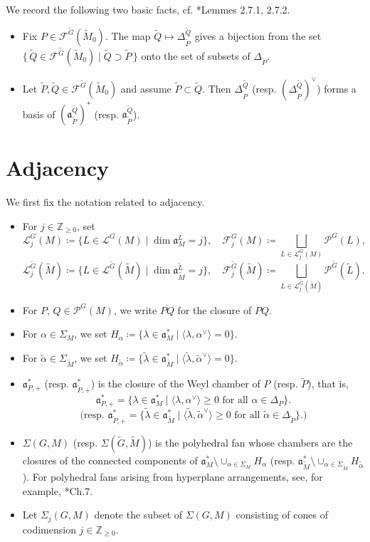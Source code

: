 \documentclass[12pt]{amsart}
\theoremstyle{definition}
\theoremstyle{plain}
\theoremstyle{remark}
\def\Z{\mathbb{Z}}%
\newcommand{\fa}{\mathfrak{a}}
\newcommand{\cF}{\mathcal{F}}
\newcommand{\cL}{\mathcal{L}}
\newcommand{\cP}{\mathcal{P}}
\numberwithin{equation}{section}
\newcommand{\tG}{\widetilde{G}}
\newcommand{\tM}{\widetilde{M}}
\newcommand{\tL}{\widetilde{L}}
\newcommand{\tP}{\widetilde{P}}
\newcommand{\tQ}{\widetilde{Q}}
\newcommand{\talpha}{\widetilde{\alpha}}
\newcommand{\tlambda}{\widetilde{\lambda}}
\begin{document}
We record the following two basic facts, cf. \cite{LW13}*{Lemmes 2.7.1, 2.7.2}.
\begin{itemize}
    \item Fix $P \in \cF^{\tG}(\tM_0)$.
    The map $\tQ \longmapsto \Delta_{\tP}^{\tQ}$ gives a bijection from the set $\{\, \tQ \in \cF^{\tG}(\tM_0) \mid \tQ \supset \tP \,\}$ onto the set of subsets of $\Delta_{\tP}$.
    \item Let $\tP, \tQ \in \cF^{\tG}(\tM_0)$ and assume $\tP \subset \tQ$. Then $\Delta_{\tP}^{\tQ}$ (resp. $(\Delta_{\tP}^{\tQ})^\vee$) forms a basis of $(\fa_{\tP}^{\tQ})^*$ (resp. $\fa_{\tP}^{\tQ}$).
\end{itemize}



\section{Adjacency}\label{sec:Adja}


We first fix the notation related to adjacency.
\begin{itemize}
    \item For $j\in\Z_{\ge 0}$, set
    \[
    \cL^G_j(M)\coloneqq\{ L\in\cL^G(M) \mid \dim\fa_M^L=j \}, \quad \cF^G_j(M)\coloneqq \bigsqcup_{L\in\cL_j^G(M)} \cP^G(L),
    \]
    \[
    \cL^{\tG}_j(\tM)\coloneqq\{ L\in\cL^{\tG}(\tM) \mid \dim\fa_{\tM}^{\tL}=j \}, \quad \cF^{\tG}_j(\tM)\coloneqq \bigsqcup_{L\in\cL_j^{\tG}(\tM)} \cP^{\tG}(\tL).
    \]
    \item For $P$, $Q\in\cP^G(M)$, we write $\overline{PQ}$ for the closure of $PQ$. 
    \item For $\alpha\in\Sigma_M$, we set $H_\alpha\coloneqq\{ \lambda\in\fa_M^* \mid \langle \lambda, \alpha^\vee\rangle=0 \}$.
    \item For $\talpha\in\Sigma_{\tM}$, we set $H_{\talpha}\coloneqq\{ \tlambda\in\fa_{\tM}^* \mid \langle \tlambda, \talpha^\vee\rangle=0 \}$.
    \item $\fa^*_{P,+}$ (resp. $\fa^*_{\tP,+}$) is the closure of the Weyl chamber of $P$ (resp. $\tP$), that is,
    \[
    \fa^*_{P,+} = \{ \lambda\in\fa_M^* \mid \langle \lambda,\alpha^\vee\rangle\ge0 \text{ for all } \alpha\in\Delta_P\}.
    \]
    \[
    \text{(resp. } \fa^*_{\tP,+} = \{ \tlambda\in\fa_{\tM}^* \mid \langle \tlambda,\talpha^\vee\rangle\ge0 \text{ for all } \talpha\in\Delta_{\tP}\}.)
    \]
    \item $\Sigma(G,M)$ (resp. $\Sigma(\tG,\tM)$) is the polyhedral fan whose chambers are the closures of the connected components of $\fa_M^*\setminus \cup_{\alpha\in\Sigma_M}H_\alpha$ (resp. $\fa_{\tM}^*\setminus \cup_{\alpha\in\Sigma_{\tM}}H_{\talpha}$). 
    For polyhedral fans arising from hyperplane arrangements, see, for example, \cite{Zie95}*{Ch.7}.
    \item Let $\Sigma_j(G,M)$ denote the subset of $\Sigma(G,M)$ consisting of cones of codimension $j\in\Z_{\ge 0}$.
\end{itemize}
\end{document}
